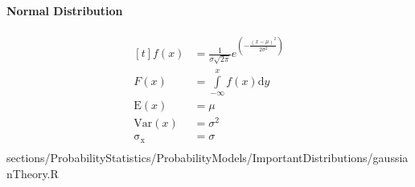 				\paragraph{Normal Distribution}
				\RTheory%
				{%
					$$\begin{aligned}[t]
						f(x) 			&=\frac{1}{{\sigma \sqrt {2\pi } }}e^{(- \frac{(x - \mu )^2 }{2\sigma ^2 })}\\
						F(x) 			&= 	 \int\limits_{-\infty}^{x} f(x)\mathrm{d}y \\
						\mathrm{E}(x) 	&= \mu \\
						\mathrm{Var}(x) &=\sigma^2 \\
					    \mathrm{\sigma_x} &= \sigma\\
					\end{aligned}$$
				}{sections/ProbabilityStatistics/ProbabilityModels/ImportantDistributions/gaussianTheory.R}
